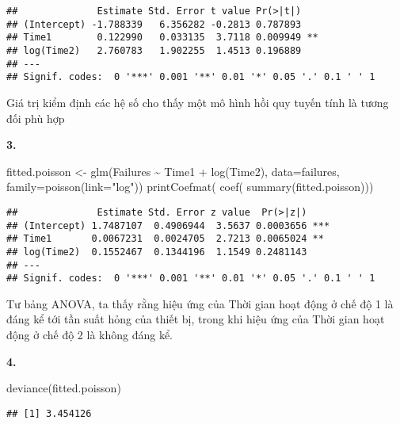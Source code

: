 \documentclass[
]{article}
\newenvironment{Shaded}{\begin{snugshade}}{\end{snugshade}}
\newcommand{\AttributeTok}[1]{\textcolor[rgb]{0.77,0.63,0.00}{#1}}
\newcommand{\FunctionTok}[1]{\textcolor[rgb]{0.00,0.00,0.00}{#1}}
\newcommand{\NormalTok}[1]{#1}
\newcommand{\OtherTok}[1]{\textcolor[rgb]{0.56,0.35,0.01}{#1}}
\newcommand{\SpecialCharTok}[1]{\textcolor[rgb]{0.00,0.00,0.00}{#1}}
\newcommand{\StringTok}[1]{\textcolor[rgb]{0.31,0.60,0.02}{#1}}
\begin{document}
\begin{verbatim}
##              Estimate Std. Error t value Pr(>|t|)   
## (Intercept) -1.788339   6.356282 -0.2813 0.787893   
## Time1        0.122990   0.033135  3.7118 0.009949 **
## log(Time2)   2.760783   1.902255  1.4513 0.196889   
## ---
## Signif. codes:  0 '***' 0.001 '**' 0.01 '*' 0.05 '.' 0.1 ' ' 1
\end{verbatim}

Giá trị kiểm định các hệ số cho thấy một mô hình hồi quy tuyến tính là
tương đối phù hợp

\textbf{3.}

\begin{Shaded}
\begin{Highlighting}[]
\NormalTok{fitted.poisson }\OtherTok{\textless{}{-}} \FunctionTok{glm}\NormalTok{(Failures }\SpecialCharTok{\textasciitilde{}}\NormalTok{ Time1 }\SpecialCharTok{+} \FunctionTok{log}\NormalTok{(Time2), }\AttributeTok{data=}\NormalTok{failures, }\AttributeTok{family=}\FunctionTok{poisson}\NormalTok{(}\AttributeTok{link=}\StringTok{"log"}\NormalTok{))}
\FunctionTok{printCoefmat}\NormalTok{( }\FunctionTok{coef}\NormalTok{( }\FunctionTok{summary}\NormalTok{(fitted.poisson)))}
\end{Highlighting}
\end{Shaded}

\begin{verbatim}
##              Estimate Std. Error z value  Pr(>|z|)    
## (Intercept) 1.7487107  0.4906944  3.5637 0.0003656 ***
## Time1       0.0067231  0.0024705  2.7213 0.0065024 ** 
## log(Time2)  0.1552467  0.1344196  1.1549 0.2481143    
## ---
## Signif. codes:  0 '***' 0.001 '**' 0.01 '*' 0.05 '.' 0.1 ' ' 1
\end{verbatim}

Tư bảng ANOVA, ta thấy rằng hiệu ứng của Thời gian hoạt động ở chế độ 1
là đáng kể tới tần suất hỏng của thiết bị, trong khi hiệu ứng của Thời
gian hoạt động ở chế độ 2 là không đáng kể.

\textbf{4.}

\begin{Shaded}
\begin{Highlighting}[]
\FunctionTok{deviance}\NormalTok{(fitted.poisson)}
\end{Highlighting}
\end{Shaded}

\begin{verbatim}
## [1] 3.454126
\end{verbatim}
\end{document}

